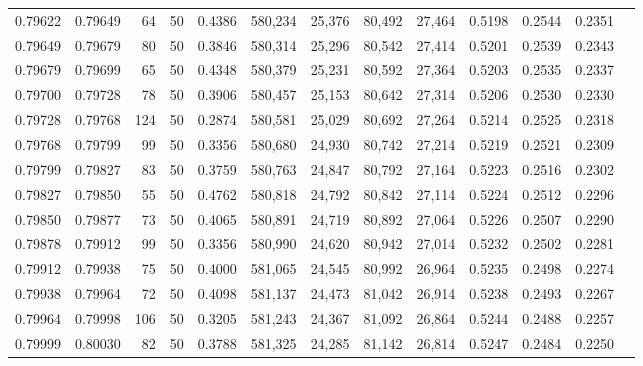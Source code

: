 \begin{tabular}{rrrrrrrrrrrrr}
0.79622 & 0.79649 &    64 &  50 &                                     0.4386 & 580,234 &  25,376 &  80,492 &  27,464 & 0.5198 & 0.2544 & 0.2351 \\
0.79649 & 0.79679 &    80 &  50 &                                     0.3846 & 580,314 &  25,296 &  80,542 &  27,414 & 0.5201 & 0.2539 & 0.2343 \\
0.79679 & 0.79699 &    65 &  50 &                                     0.4348 & 580,379 &  25,231 &  80,592 &  27,364 & 0.5203 & 0.2535 & 0.2337 \\
0.79700 & 0.79728 &    78 &  50 &                                     0.3906 & 580,457 &  25,153 &  80,642 &  27,314 & 0.5206 & 0.2530 & 0.2330 \\
0.79728 & 0.79768 &   124 &  50 &                                     0.2874 & 580,581 &  25,029 &  80,692 &  27,264 & 0.5214 & 0.2525 & 0.2318 \\
0.79768 & 0.79799 &    99 &  50 &                                     0.3356 & 580,680 &  24,930 &  80,742 &  27,214 & 0.5219 & 0.2521 & 0.2309 \\
0.79799 & 0.79827 &    83 &  50 &                                     0.3759 & 580,763 &  24,847 &  80,792 &  27,164 & 0.5223 & 0.2516 & 0.2302 \\
0.79827 & 0.79850 &    55 &  50 &                                     0.4762 & 580,818 &  24,792 &  80,842 &  27,114 & 0.5224 & 0.2512 & 0.2296 \\
0.79850 & 0.79877 &    73 &  50 &                                     0.4065 & 580,891 &  24,719 &  80,892 &  27,064 & 0.5226 & 0.2507 & 0.2290 \\
0.79878 & 0.79912 &    99 &  50 &                                     0.3356 & 580,990 &  24,620 &  80,942 &  27,014 & 0.5232 & 0.2502 & 0.2281 \\
0.79912 & 0.79938 &    75 &  50 &                                     0.4000 & 581,065 &  24,545 &  80,992 &  26,964 & 0.5235 & 0.2498 & 0.2274 \\
0.79938 & 0.79964 &    72 &  50 &                                     0.4098 & 581,137 &  24,473 &  81,042 &  26,914 & 0.5238 & 0.2493 & 0.2267 \\
0.79964 & 0.79998 &   106 &  50 &                                     0.3205 & 581,243 &  24,367 &  81,092 &  26,864 & 0.5244 & 0.2488 & 0.2257 \\
0.79999 & 0.80030 &    82 &  50 &                                     0.3788 & 581,325 &  24,285 &  81,142 &  26,814 & 0.5247 & 0.2484 & 0.2250 \\

\end{tabular}
